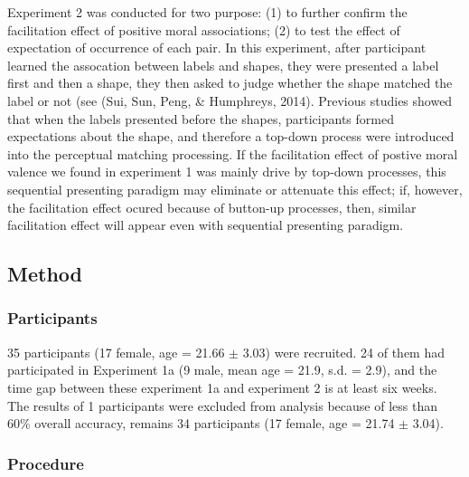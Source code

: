 \documentclass[man]{apa6}
\begin{document}
Experiment 2 was conducted for two purpose: (1) to further confirm the facilitation effect of positive moral associations; (2) to test the effect of expectation of occurrence of each pair. In this experiment, after participant learned the assocation between labels and shapes, they were presented a label first and then a shape, they then asked to judge whether the shape matched the label or not (see (Sui, Sun, Peng, \& Humphreys, 2014). Previous studies showed that when the labels presented before the shapes, participants formed expectations about the shape, and therefore a top-down process were introduced into the perceptual matching processing. If the facilitation effect of postive moral valence we found in experiment 1 was mainly drive by top-down processes, this sequential presenting paradigm may eliminate or attenuate this effect; if, however, the facilitation effect ocured because of button-up processes, then, similar facilitation effect will appear even with sequential presenting paradigm.

\hypertarget{method-2}{%
\subsection{Method}\label{method-2}}

\hypertarget{participants-3}{%
\subsubsection{Participants}\label{participants-3}}

35 participants (17 female, age = 21.66 \(\pm\) 3.03) were recruited. 24 of them had participated in Experiment 1a (9 male, mean age = 21.9, s.d. = 2.9), and the time gap between these experiment 1a and experiment 2 is at least six weeks. The results of 1 participants were excluded from analysis because of less than 60\% overall accuracy, remains 34 participants (17 female, age = 21.74 \(\pm\) 3.04).

\hypertarget{procedure-3}{%
\subsubsection{Procedure}\label{procedure-3}}
\end{document}
